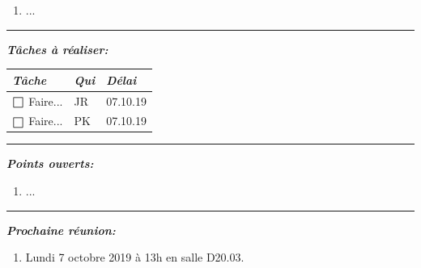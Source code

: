 \documentclass[a4paper]{article}
\newcommand{\HRule}{\vspace{12pt}\noindent\rule{\linewidth}{0.4pt}\vspace{12pt}}
\def\msquare{$\mathord{\scalerel*{\Box}{gX}}\ $}
\begin{document}
\begin{enumerate}
	\item ...
\end{enumerate}

\HRule


\textbf{\textit{Tâches à réaliser:}} \\

\renewcommand{\arraystretch}{1.5}
\begin{tabularx}{\textwidth-\parindent}{Xll}
	\textit{Tâche} & \textit{Qui} & \textit{Délai} \\
	\hline
	\msquare Faire... & JR & 07.10.19 \\
	\msquare Faire... & PK & 07.10.19 \\
\end{tabularx}

\HRule


\textbf{\textit{Points ouverts:}}

\begin{enumerate}[\hspace{0.4cm}$\bullet$]
	\item ...
\end{enumerate}

\HRule


\textbf{\textit{Prochaine réunion:}}

\begin{enumerate}[\hspace{0.4cm}$\bullet$]
	\item Lundi 7 octobre 2019 à 13h en salle D20.03.
\end{enumerate}
\end{document}
